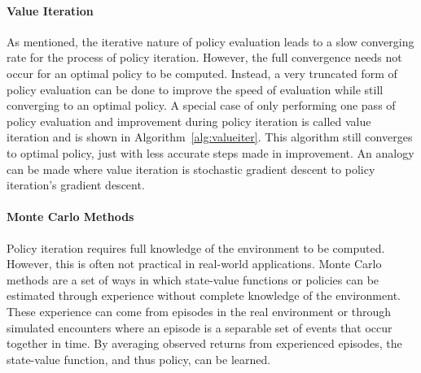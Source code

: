 

\paragraph*{Value Iteration}

As mentioned,
the iterative nature of policy evaluation leads to a slow converging rate
for the process of policy iteration.
%
However,
the full convergence needs not occur for an optimal policy to be computed.
%
Instead,
a very truncated form of policy evaluation can be done to improve the speed
of evaluation while still converging to an optimal policy.
%
A special case of only performing one pass of policy evaluation and improvement
during policy iteration is called value iteration
and is shown in Algorithm~\ref{alg:valueiter}. 
%
This algorithm still converges to optimal policy,
just with less accurate steps made in improvement.
%
An analogy can be made where value iteration is stochastic gradient descent
to policy iteration's gradient descent.



\paragraph*{Monte Carlo Methods}


Policy iteration requires full knowledge of the environment to be computed.
%
However,
this is often not practical in real-world applications.
%
Monte Carlo methods are a set of ways in which
state-value functions or policies can be estimated through experience without
complete knowledge of the environment.
%
These experience can come from episodes in the real environment
or through simulated encounters
where an episode is a separable set of events that occur together in
time.
%
By averaging observed returns from experienced episodes,
the state-value function,
and thus policy,
can be learned.

